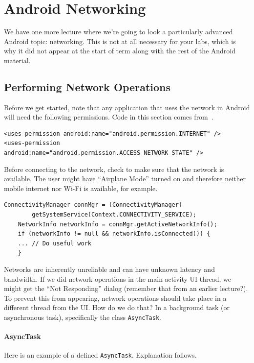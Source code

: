 




\section*{Android Networking}

We have one more lecture where we're going to look a particularly advanced Android topic: networking. This is not at all necessary for your labs, which is why it did not appear at the start of term along with the rest of the Android material. 

\subsection*{Performing Network Operations}
Before we get started, note that any application that uses the network in Android will need the following permissions.  Code in this section comes from~\cite{android:network1}.
\begin{verbatim}
<uses-permission android:name="android.permission.INTERNET" />
<uses-permission android:name="android.permission.ACCESS_NETWORK_STATE" />
\end{verbatim}

Before connecting to the network, check to make sure that the network is available. The user might have ``Airplane Mode'' turned on and therefore neither mobile internet nor Wi-Fi is available, for example. 

\begin{verbatim}
ConnectivityManager connMgr = (ConnectivityManager) 
        getSystemService(Context.CONNECTIVITY_SERVICE);
    NetworkInfo networkInfo = connMgr.getActiveNetworkInfo();
    if (networkInfo != null && networkInfo.isConnected()) {
    ... // Do useful work
    }
\end{verbatim}

Networks are inherently unreliable and can have unknown latency and bandwidth. If we did network operations in the main activity UI thread, we might get the ``Not Responding'' dialog (remember that from an earlier lecture?). To prevent this from appearing, network operations should take place in a different thread from the UI. How do we do that? In a background task (or asynchronous task), specifically the class \texttt{AsyncTask}. 


\paragraph{AsyncTask} Here is an example of a defined \texttt{AsyncTask}. Explanation follows.

